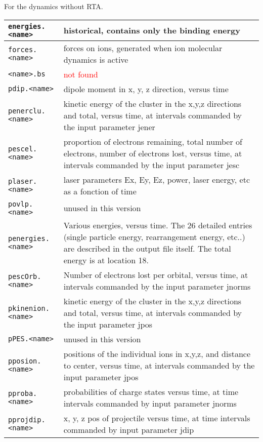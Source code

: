 \documentclass[11pt]{article}
\begin{document}
For the dynamics without RTA.\\
\begin{tabular}{|p{4.5cm}|p{10.2cm}|}
	\hline
	\texttt{energies.<name>} & historical, contains only the binding energy\\
	\hline
	\texttt{forces.<name>} & forces on ions, generated when ion molecular dynamics is active\\
	\hline
	\texttt{<name>.bs} & \textcolor{red}{not found}\\
	\hline
	\texttt{pdip.<name>} &  dipole moment in x, y, z direction, versus time \\
	\hline
	\texttt{penerclu.<name>} & kinetic energy of the cluster in the x,y,z directions and total, versus time, at intervals commanded by the input parameter jener\\
		\hline
	\texttt{pescel.<name>} & proportion of electrons remaining, total number of electrons, number of electrons lost, versus time, at intervals commanded by the input parameter jesc\\
	\hline
	\texttt{plaser.<name>} & laser parameters Ex, Ey, Ez, power, laser energy, etc as a fonction of time\\
	\hline
	\texttt{povlp.<name>} & unused in this version\\
	\hline
	\texttt{penergies.<name>} & Various energies, versus time. The 26 detailed entries (single particle energy, rearrangement energy, etc..) are described in the output file itself. The total energy is at location 18. \\
	\hline
	\texttt{pescOrb.<name>} & Number of electrons lost per orbital, versus time, at intervals commanded by the input parameter jnorms \\
	\hline
	\texttt{pkinenion.<name>} & kinetic energy of the cluster in the x,y,z directions and total, versus time, at intervals commanded by the input parameter jpos\\
	\hline
	\texttt{pPES.<name>} & unused in this version\\
	\hline
	\texttt{pposion.<name>} & positions of the individual ions in x,y,z, and distance to center, versus time, at intervals commanded by the input parameter jpos\\
	\hline
	\texttt{pproba.<name>} & probabilities of charge states versus time, at time intervals commanded by input parameter jnorms\\
	\hline
	\texttt{pprojdip.<name>} & x, y, z pos of projectile versus time, at time intervals commanded by input parameter jdip\\

\end{tabular}
\end{document}
